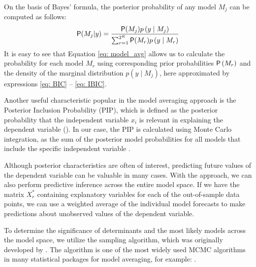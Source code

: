 On the basis of Bayes' formula, the posterior probability
of any model $M_j$ can be computed as follows:
\begin{equation}
	\mathsf{P}(M_j|y) = \frac{\mathsf{P}(M_j)p\left( y \mid M_j\right)}
	{\sum_{r=1}^{2^K}\mathsf{P}(M_r)p\left( y \mid M_r\right)}
	\label{eq: model_avg}
\end{equation}
It is easy to see that Equation \ref{eq: model_avg} allows
us to calculate the probability for each model $M_r$ using
corresponding prior probabilities $\mathsf{P}\left( M_r\right)$ and
the density of the marginal distribution $p(y \mid M_j)$,
here approximated by expressions \ref{eq: BIC} -- \ref{eq: IBIC}.

Another useful characteristic popular in the model averaging
approach is the Posterior Inclusion Probability (PIP), which
is defined as the posterior probability that the independent
variable $x_i$ is relevant in explaining the dependent variable
(\cite{Leamer1978, mitchell_beauchamp_1988}). In our case, the
PIP is calculated using Monte Carlo integration, as the sum of
the posterior model probabilities for all models that include
the specific independent variable \citep{Forte_Garcia_Steel_2018}.

Although posterior characteristics are often of interest,
predicting future values of the dependent variable can be
valuable in many cases. With the  approach, we can
also perform predictive inference across the entire model space.
If we have the matrix $X_r^*$ containing explanatory variables
for each of the out-of-sample data points, we can use a
weighted average of the individual model forecasts to make
predictions about unobserved values of the dependent variable.

To determine the significance of determinants and the most
likely models across the model space, we utilize the \MCcube
sampling algorithm, which was originally developed by
\cite{madiganyork1995}. The \MCcube algorithm is one of the most
widely used MCMC algorithms in many statistical packages for
model averaging, for example:
\cite{LamnisosGriffinSteel2013,JSSv068i04,rafteryhoetingvolinskypainteryeung_bma,JSSv104i02}.
